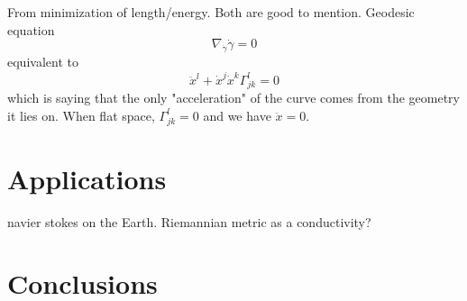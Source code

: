 \documentclass[UKenglish]{beamer}
\begin{document}
\begin{frame}{}
	From minimization of length/energy. Both are good to mention.	Geodesic equation
	\[
	\nabla_{\dot{\gamma}} \dot{\gamma}=0
	\]
	equivalent to
	\[
	\ddot{x}^l + \dot{x}^j\dot{x}^k \Gamma_{jk}^l=0
	\]
	which is saying that the only "acceleration" of the curve comes from the geometry it lies on. When flat space, $\Gamma_{jk}^l=0$ and we have $\ddot{x}=0$.
\end{frame}




\section{Applications}
 navier stokes on the Earth. Riemannian metric as a conductivity?








\section{Conclusions}
\end{document}
